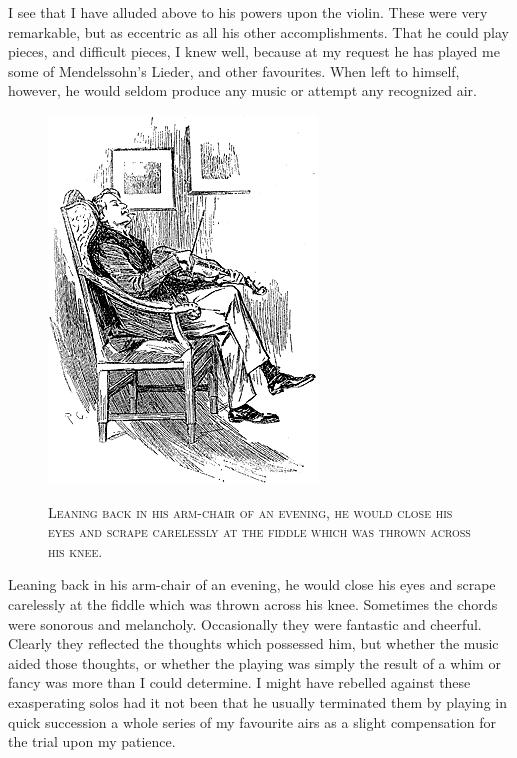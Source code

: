 \documentclass[12pt,english]{book}
\newcommand{\noun}[1]{\textsc{#1}}
\begin{document}
I see that I have alluded above to his powers upon the violin. These
were very remarkable, but as eccentric as all his other accomplishments.
That he could play pieces, and difficult pieces, I knew well, because
at my request he has played me some of Mendelssohn's Lieder, and other
favourites. When left to himself, however, he would seldom produce
any music or attempt any recognized air. %
\begin{figure}[htbp]
\noindent \begin{center}\includegraphics{images/study10-stud-03.png}\end{center}

\noindent \begin{center}\noun{Leaning back in his arm-chair of an
evening, he would close his eyes and scrape carelessly at the fiddle
which was thrown across his knee.}\end{center}
\end{figure}
Leaning back in his arm-chair of an evening, he would close his eyes
and scrape carelessly at the fiddle which was thrown across his knee.
Sometimes the chords were sonorous and melancholy. Occasionally they
were fantastic and cheerful. Clearly they reflected the thoughts which
possessed him, but whether the music aided those thoughts, or whether
the playing was simply the result of a whim or fancy was more than
I could determine. I might have rebelled against these exasperating
solos had it not been that he usually terminated them by playing in
quick succession a whole series of my favourite airs as a slight compensation
for the trial upon my patience.
\end{document}
